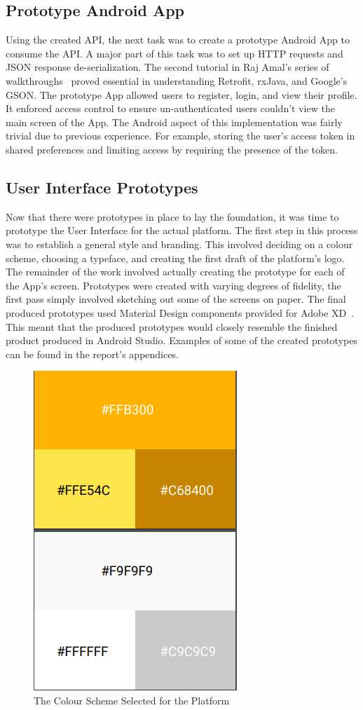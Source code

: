 \subsection{Prototype Android App}
Using the created API, the next task was to create a prototype Android App to consume the API. A major part of this task was to set up HTTP requests and JSON response de-serialization. The second tutorial in Raj Amal's series of walkthroughs~\cite{nodejs_authentication_tutorial_ref} proved essential in understanding Retrofit, rxJava, and Google's GSON. The prototype App allowed users to register, login, and view their profile. It enforced access control to ensure un-authenticated users couldn't view the main screen of the App. The Android aspect of this implementation was fairly trivial due to previous experience. For example, storing the user's access token in shared preferences and limiting access by requiring the presence of the token.

\subsection{User Interface Prototypes}
Now that there were prototypes in place to lay the foundation, it was time to prototype the User Interface for the actual platform. The first step in this process was to establish a general style and branding. This involved deciding on a colour scheme, choosing a typeface, and creating the first draft of the platform's logo. The remainder of the work involved actually creating the prototype for each of the App's screen. Prototypes were created with varying degrees of fidelity, the first pass simply involved sketching out some of the screens on paper. The final produced prototypes used Material Design components provided for Adobe XD~\cite{adobeXD_documentation_ref}. This meant that the produced prototypes would closely resemble the finished product produced in Android Studio. Examples of some of the created prototypes can be found in the report's appendices.

\begin{figure}[!htb]
	\centering
	\includegraphics[width=0.5\linewidth]{Resources/img/color-scheme.png}
	\caption{The Colour Scheme Selected for the Platform}
	\label{fig:color-scheme}
\end{figure}

